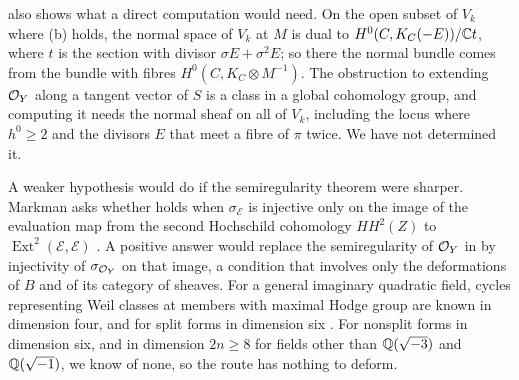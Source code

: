  also shows what a direct computation would need. On the
open subset of $V_{k}$ where (b) holds, the normal space of $V_{k}$ at $M$ is
dual to $H^{0}(C,K_{C}(-E))/\mathbb{C} t$, where $t$ is the section with divisor
$\sigma E+\sigma^{2}E$; so there the normal bundle comes from the bundle
with fibres $H^{0}(C,K_{C}\otimes M^{-1})$. The obstruction to extending
$\mathcal{O}_{Y}$ along a tangent vector of $S$ is a class in a global cohomology
group, and computing it needs the normal sheaf on all of $V_{k}$, including
the locus where $h^{0}\ge2$ and the divisors $E$ that meet a fibre of $\pi$
twice. We have not determined it.

A weaker hypothesis would do if the semiregularity theorem were sharper.
Markman asks whether  holds when $\sigma_{\mathcal{E}}$ is
injective only on the image of the evaluation map from the second Hochschild
cohomology $HH^{2}(Z)$ to $\operatorname{Ext}^{2}(\mathcal{E},\mathcal{E})$
\cite[Question~11.4]{Mar25b}. A positive answer would replace the
semiregularity of $\mathcal{O}_{Y}$ in  by injectivity of
$\sigma_{\mathcal{O}_{Y}}$ on that image, a condition that involves only the
deformations of $B$ and of its category of sheaves. For a general imaginary
quadratic field, cycles representing Weil classes at members with maximal
Hodge group are known in dimension four, and for split forms in dimension
six \cite{Mar25a}. For nonsplit forms in dimension six, and in dimension
$2n\ge8$ for fields other than $\mathbb{Q}(\sqrt{-3})$ and $\mathbb{Q}(\sqrt{-1})$, we
know of none, so the route has nothing to deform.
